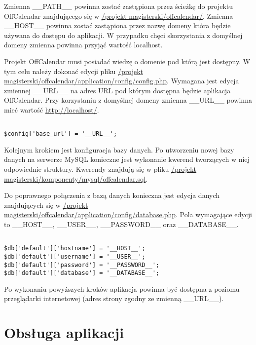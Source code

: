 Zmienna \_\_PATH\_\_ powinna zostać zastąpiona przez ścieżkę do projektu OffCalendar znajdującego się w \url{/projekt magisterski/offcalendar/}. Zmienna \_\_HOST\_\_ powinna zostać zastąpiona przez nazwę domeny która będzie używana do dostępu do aplikacji. W przypadku chęci skorzystania z domyślnej domeny zmienna powinna przyjąć wartość localhost.

Projekt OffCalendar musi posiadać wiedzę o domenie pod którą jest dostępny. W tym celu należy dokonać edycji pliku \url{/projekt magisterski/offcalendar/application/config/config.php}. Wymagana jest edycja zmiennej \_\_URL\_\_ na adres URL pod którym dostępna będzie aplikacja OffCalendar. Przy korzystaniu z domyślnej domeny zmienna \_\_URL\_\_ powinna mieć wartość \url{http://localhost/}.

\begin{lstlisting}[caption=Konfiguracja adresu URL dla projektu OffCalendar., label=amb, captionpos=b]

$config['base_url'] = '__URL__';

\end{lstlisting}

Kolejnym krokiem jest konfiguracja bazy danych. Po utworzeniu nowej bazy danych na serwerze MySQL konieczne jest wykonanie kwerend tworzących w niej odpowiednie struktury. Kwerendy znajdują się w pliku \url{/projekt magisterski/komponenty/mysql/offcalendar.sql}.

Do poprawnego połączenia z bazą danych konieczna jest edycja danych znajdujących się w \url{/projekt magisterski/offcalendar/application/config/database.php}. Pola wymagające edycji to \_\_HOST\_\_, \_\_USER\_\_, \_\_PASSWORD\_\_ oraz \_\_DATABASE\_\_.

\begin{lstlisting}[caption=Konfiguracja dostępu do bazy danych., label=amb, captionpos=b]

$db['default']['hostname'] = '__HOST__';
$db['default']['username'] = '__USER__';
$db['default']['password'] = '__PASSWORD__';
$db['default']['database'] = '__DATABASE__';

\end{lstlisting}

Po wykonaniu powyższych kroków aplikacja powinna być dostępna z poziomu przeglądarki internetowej (adres strony zgodny ze zmienną \_\_URL\_\_).

\section{Obsługa aplikacji}
\label{sec:obslAp}

